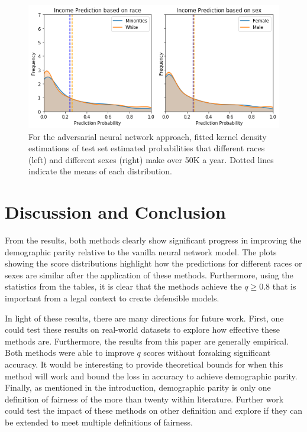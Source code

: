 \documentclass{article}
\begin{document}
\begin{figure}[ht]
	\vskip 0.2in
	\begin{center}
		\centerline{\includegraphics[width=\columnwidth]{img/adv_end.png}}
		\caption{For the adversarial neural network approach, fitted kernel density estimations of test set estimated probabilities that different races (left) and different sexes (right) make over 50K a year.  Dotted lines indicate the means of each distribution.}
		\label{adv-bias}
	\end{center}
	\vskip -0.1in
\end{figure}

\section{Discussion and Conclusion}
From the results, both methods clearly show significant progress in improving the demographic parity relative to the vanilla neural network model. The plots showing the score distributions highlight how the predictions for different races or sexes are similar after the application of these methods. Furthermore, using the statistics from the tables, it is clear that the methods achieve the $q \geq 0.8$ that is important from a legal context to create defensible models.

In light of these results, there are many directions for future work. First, one could test these results on real-world datasets to explore how effective these methods are. Furthermore, the results from this paper are generally empirical. Both methods were able to improve $q$ scores without forsaking significant accuracy. It would be interesting to provide theoretical bounds for when this method will work and bound the loss in accuracy to achieve demographic parity. Finally, as mentioned in the introduction, demographic parity is only one definition of fairness of the more than twenty within literature. Further work could test the impact of these methods on other definition and explore if they can be extended to meet multiple definitions of fairness.



\end{document}
